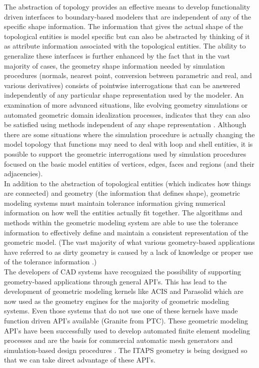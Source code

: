 \documentclass{article}
\begin{document}
The abstraction of topology provides an effective means to 
develop functionality driven interfaces to boundary-based modelers 
that are independent of any of the specific shape information. 
The information that gives the actual shape of the topological 
entities is model specific but can also be abstracted by thinking 
of it as attribute information associated with the topological 
entities. The ability to generalize these interfaces is further 
enhanced by the fact that in the vast majority of cases, the 
geometry shape information needed by simulation procedures (normals, 
nearest point, conversion between parametric and real, and various 
derivatives) consists of pointwise interrogations that can be 
answered independently of any particular shape representation 
used by the modeler. An examination of more advanced situations, 
like evolving geometry simulations or automated geometric domain 
idealization processes, indicates that they can also be satisfied 
using methods independent of any shape representation \cite{r10, r28}. 
Although there are some situations where the simulation procedure 
is actually changing the model topology that functions may need 
to deal with loop and shell entities, it is possible to support 
the geometric interrogations used by simulation procedures focused 
on the basic model entities of vertices, edges, faces and regions 
(and their adjacencies). \\


In addition to the abstraction of topological entities (which 
indicates how things are connected) and geometry (the information 
that defines shape), geometric modeling systems must maintain 
tolerance information giving numerical information on how well 
the entities actually fit together. The algorithms and methods 
within the geometric modeling system are able to use the tolerance 
information to effectively define and maintain a consistent representation 
of the geometric model. (The vast majority of what various geometry-based 
applications have referred to as dirty geometry is caused by 
a lack of knowledge or proper use of the tolerance information 
 \cite{r3}.) \\


The developers of CAD systems have recognized the possibility 
of supporting geometry-based applications through general API's. 
This has lead to the development of geometric modeling kernels 
like ACIS and Parasolid which are now used as the geometry engines 
for the majority of geometric modeling systems. Even those systems 
that do not use one of these kernels have made function driven 
API's available (Granite from PTC). These geometric modeling 
API's have been successfully used to develop automated finite 
element modeling processes \cite{r12, r23} and are the basis for commercial 
automatic mesh generators and simulation-based design procedures 
 \cite{r3}. The ITAPS geometry is being designed so that we can take 
direct advantage of these API's.\\
\end{document}
